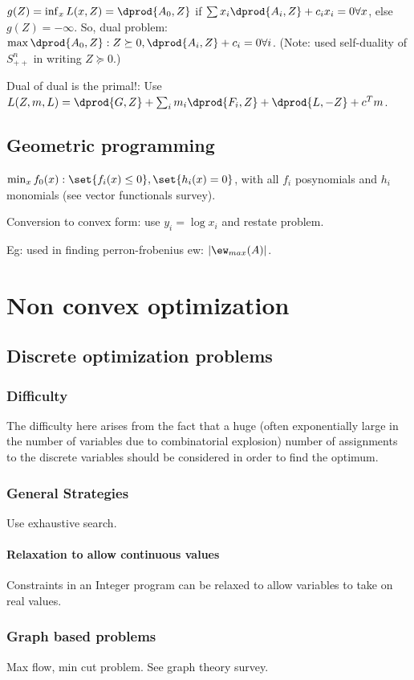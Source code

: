 \documentclass[oneside, article]{memoir}
\begin{document}
$g(Z) = \inf_x L(x, Z) = \dprod{A_0, Z}$ if $\sum x_i\dprod{A_i, Z} + c_ix_i = 0 \forall x$, else $g(Z) = -\infty$. So, dual problem: $\max \dprod{A_0, Z}: Z \succeq 0, \dprod{A_i, Z} + c_i = 0 \forall i$. (Note: used self-duality of $S_{++}^{n}$ in writing $Z \succeq 0$.) 

Dual of dual is the primal!: Use $L(Z, m, L) = \dprod{G, Z} + \sum_i m_i  \dprod{F_i, Z} + \dprod{L, -Z} + c^{T}m$.

\chapter{Geometric programming}
$\min_x f_{0}(x): \set{f_{i}(x) \leq 0}, \set{h_{i}(x) = 0} $, with all $f_i$ posynomials and $h_i$ monomials (see vector functionals survey).

Conversion to convex form: use $y_i = \log x_i$ and restate problem.

Eg: used in finding perron-frobenius ew: $|\ew_{max}(A)|$.

\part{Non convex optimization}
\chapter{Discrete optimization problems}
\section{Difficulty}
The difficulty here arises from the fact that a huge (often exponentially large in the number of variables due to combinatorial explosion) number of assignments to the discrete variables should be considered in order to find the optimum.

\section{General Strategies}
Use exhaustive search.

\subsection{Relaxation to allow continuous values}
Constraints in an Integer program can be relaxed to allow variables to take on real values.

\section{Graph based problems}
Max flow, min cut problem. See graph theory survey.
\end{document}
